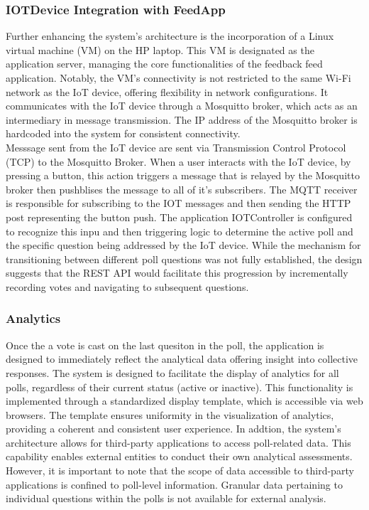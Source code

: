 \subsubsection{IOTDevice Integration with FeedApp}
Further enhancing the system's architecture is the incorporation of a Linux virtual machine (VM) on the HP laptop. This VM is designated as the application server, managing the core functionalities of the feedback feed application. Notably, the VM's connectivity is not restricted to the same Wi-Fi network as the IoT device, offering flexibility in network configurations. It communicates with the IoT device through a Mosquitto broker, which acts as an intermediary in message transmission. The IP address of the Mosquitto broker is hardcoded into the system for consistent connectivity.\\

\noindent Messsage sent from the IoT device are sent via Transmission Control Protocol (TCP) to the Mosquitto Broker. When a user interacts with the IoT device, by pressing a button, this action triggers a message that is relayed by the Mosquitto broker then pushblises the message to all of it's subscribers. The MQTT receiver  is responsible for subscribing to the IOT messages and then sending the HTTP post representing the button push.  The application IOTController is configured to recognize this inpu and then triggering logic to determine the active poll and the specific question being addressed by the IoT device. While the mechanism for transitioning between different poll questions was not fully established, the design suggests that the REST API would facilitate this progression by incrementally recording votes and navigating to subsequent questions.

\subsubsection{Analytics}
Once the a vote is cast on the last quesiton in the poll, the application is designed to immediately reflect the analytical data offering insight into collective responses.  The system is designed to facilitate the display of analytics for all polls, regardless of their current status (active or inactive).  This functionality is implemented through a standardized display template, which is accessible via web browsers. The template ensures uniformity in the visualization of analytics, providing a coherent and consistent user experience. In addtion, the system's architecture allows for third-party applications to access poll-related data.  This capability enables external entities to conduct their own analytical assessments.  However, it is important to note that the scope of data accessible to third-party applications is confined to poll-level information. Granular data pertaining to individual questions within the polls is not available for external analysis.

